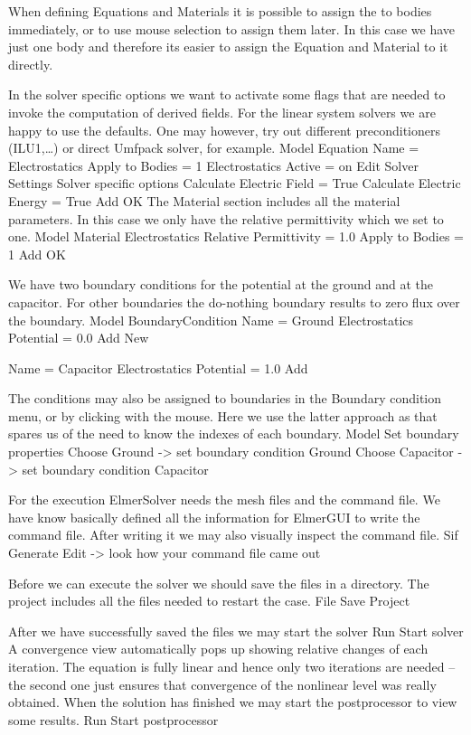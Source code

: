 When defining Equations and Materials it is possible to assign the to bodies immediately, or to use mouse
selection to assign them later. In this case we have just one body and therefore its easier to assign 
the Equation and Material to it directly.

In the solver specific options we want to activate some flags that are needed to invoke the 
computation of derived fields. 
For the linear system solvers we are happy to use the defaults. One may however, try out different
preconditioners (ILU1,\ldots) or direct Umfpack solver, for example.
\ttbegin
Model
  Equation
    Name = Electrostatics
    Apply to Bodies = 1
    Electrostatics
      Active = on
      Edit Solver Settings
        Solver specific options
          Calculate Electric Field = True
          Calculate Electric Energy = True
    Add 
    OK
\ttend        
The Material section includes all the material parameters.
In this case we only have the relative permittivity which we set to one.
\ttbegin
Model
  Material
    Electrostatics
      Relative Permittivity = 1.0
    Apply to Bodies = 1 
    Add
    OK
\ttend

We have two boundary conditions for the potential at the ground and at the capacitor. For other boundaries
the do-nothing boundary results to zero flux over the boundary.
\ttbegin
Model
  BoundaryCondition
    Name = Ground
    Electrostatics
      Potential = 0.0
    Add
    New

    Name = Capacitor
    Electrostatics
      Potential = 1.0
    Add
\ttend   

The conditions may also be assigned to boundaries in the Boundary condition menu, or 
by clicking with the mouse. Here we use the latter approach as that spares us of the 
need to know the indexes of each boundary.
\ttbegin
Model
  Set boundary properties
    Choose Ground -> set boundary condition Ground
    Choose Capacitor -> set boundary condition Capacitor
\ttend


For the execution 
ElmerSolver needs the mesh files and the command file. We have know basically defined
all the information for ElmerGUI to write the command file. After writing it we may also visually 
inspect the command file.
\ttbegin
Sif 
  Generate
  Edit -> look how your command file came out  
\ttend

Before we can execute the solver we should save the files in a directory. The project includes
all the files needed to restart the case.
\ttbegin
File 
  Save Project
\ttend

After we have successfully saved the files we may start the solver
\ttbegin
Run
  Start solver
\ttend
A convergence view automatically pops up showing relative changes of each iteration.
The equation is fully linear and hence only two iterations are needed -- the second 
one just ensures that convergence of the nonlinear level was really obtained. 
When the solution has finished we may start the postprocessor to view some results.
\ttbegin
Run
  Start postprocessor
\ttend


